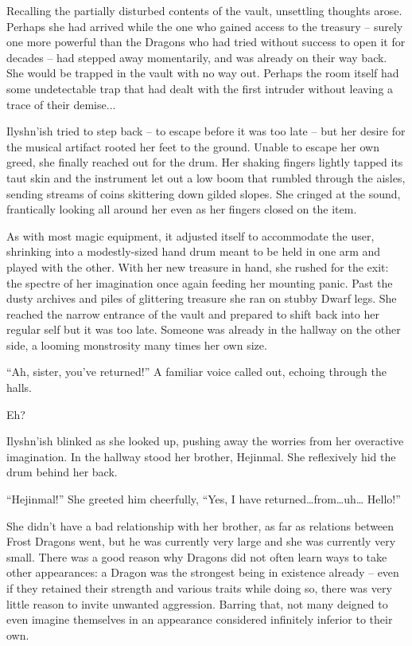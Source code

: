  

Recalling the partially disturbed contents of the vault, unsettling thoughts arose. Perhaps she had arrived while the one who gained access to the treasury – surely one more powerful than the Dragons who had tried without success to open it for decades – had stepped away momentarily, and was already on their way back. She would be trapped in the vault with no way out. Perhaps the room itself had some undetectable trap that had dealt with the first intruder without leaving a trace of their demise...

 

Ilyshn’ish tried to step back – to escape before it was too late – but her desire for the musical artifact rooted her feet to the ground. Unable to escape her own greed, she finally reached out for the drum. Her shaking fingers lightly tapped its taut skin and the instrument let out a low boom that rumbled through the aisles, sending streams of coins skittering down gilded slopes. She cringed at the sound, frantically looking all around her even as her fingers closed on the item.

 

As with most magic equipment, it adjusted itself to accommodate the user, shrinking into a modestly-sized hand drum meant to be held in one arm and played with the other. With her new treasure in hand, she rushed for the exit: the spectre of her imagination once again feeding her mounting panic. Past the dusty archives and piles of glittering treasure she ran on stubby Dwarf legs. She reached the narrow entrance of the vault and prepared to shift back into her regular self but it was too late. Someone was already in the hallway on the other side, a looming monstrosity many times her own size.

 

“Ah, sister, you’ve returned!” A familiar voice called out, echoing through the halls.

 

Eh?

 

Ilyshn’ish blinked as she looked up, pushing away the worries from her overactive imagination. In the hallway stood her brother, Hejinmal. She reflexively hid the drum behind her back.

 

“Hejinmal!” She greeted him cheerfully, “Yes, I have returned…from…uh… Hello!”

 

She didn't have a bad relationship with her brother, as far as relations between Frost Dragons went, but he was currently very large and she was currently very small. There was a good reason why Dragons did not often learn ways to take other appearances: a Dragon was the strongest being in existence already – even if they retained their strength and various traits while doing so, there was very little reason to invite unwanted aggression. Barring that, not many deigned to even imagine themselves in an appearance considered infinitely inferior to their own.

